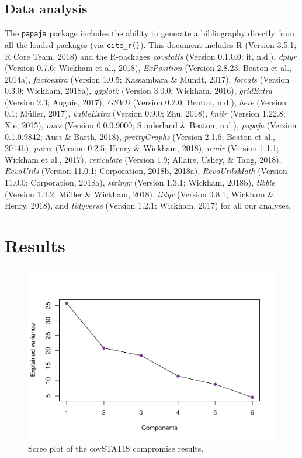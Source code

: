 \documentclass[man,floatsintext]{apa6}
\theoremstyle{definition}
\theoremstyle{definition}
\theoremstyle{definition}
\theoremstyle{remark}
\begin{document}
\hypertarget{data-analysis}{%
\subsection{Data analysis}\label{data-analysis}}

The \texttt{papaja} package includes the ability to generate a
bibliography directly from all the loaded packages (via
\texttt{cite\_r()}). This document includes R (Version 3.5.1; R Core
Team, 2018) and the R-packages \emph{covstatis} (Version 0.1.0.0; it,
n.d.), \emph{dplyr} (Version 0.7.6; Wickham et al., 2018),
\emph{ExPosition} (Version 2.8.23; Beaton et al., 2014a),
\emph{factoextra} (Version 1.0.5; Kassambara \& Mundt, 2017),
\emph{forcats} (Version 0.3.0; Wickham, 2018a), \emph{ggplot2} (Version
3.0.0; Wickham, 2016), \emph{gridExtra} (Version 2.3; Auguie, 2017),
\emph{GSVD} (Version 0.2.0; Beaton, n.d.), \emph{here} (Version 0.1;
Müller, 2017), \emph{kableExtra} (Version 0.9.0; Zhu, 2018),
\emph{knitr} (Version 1.22.8; Xie, 2015), \emph{ours} (Version
0.0.0.9000; Sunderland \& Beaton, n.d.), \emph{papaja} (Version
0.1.0.9842; Aust \& Barth, 2018), \emph{prettyGraphs} (Version 2.1.6;
Beaton et al., 2014b), \emph{purrr} (Version 0.2.5; Henry \& Wickham,
2018), \emph{readr} (Version 1.1.1; Wickham et al., 2017),
\emph{reticulate} (Version 1.9; Allaire, Ushey, \& Tang, 2018),
\emph{RevoUtils} (Version 11.0.1; Corporation, 2018b, 2018a),
\emph{RevoUtilsMath} (Version 11.0.0; Corporation, 2018a),
\emph{stringr} (Version 1.3.1; Wickham, 2018b), \emph{tibble} (Version
1.4.2; Müller \& Wickham, 2018), \emph{tidyr} (Version 0.8.1; Wickham \&
Henry, 2018), and \emph{tidyverse} (Version 1.2.1; Wickham, 2017) for
all our analyses.

\hypertarget{results}{%
\section{Results}\label{results}}

\begin{figure}[H]

{\centering \includegraphics{2_RMarkdown_APA_Manuscript_files/figure-latex/scree-1} 

}

\caption{Scree plot of the covSTATIS compromise results.}\label{fig:scree}
\end{figure}
\end{document}
